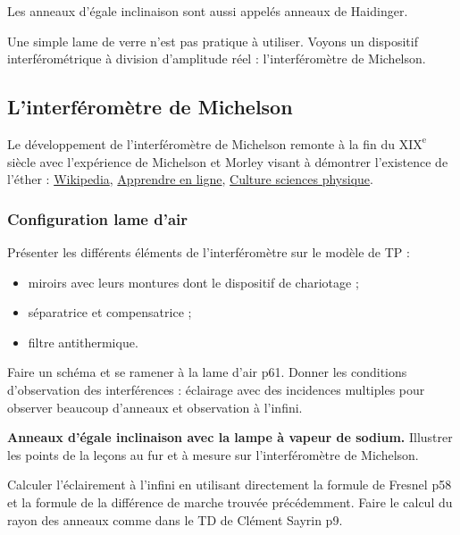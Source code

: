 \begin{remarque}
Les anneaux d'égale inclinaison sont aussi appelés anneaux de Haidinger.
\end{remarque}

\begin{transition}
Une simple lame de verre n'est pas pratique à utiliser.
Voyons un dispositif interférométrique à division d'amplitude réel : l'interféromètre de Michelson.
\end{transition}

\subsection{L'interféromètre de Michelson}

\begin{remarque}
Le développement de l'interféromètre de Michelson remonte à la fin du $\mathrm{XIX^e}$ siècle avec l'expérience de Michelson et Morley visant à démontrer l'existence de l'éther : \href{https://fr.wikipedia.org/wiki/Exp\%C3\%A9rience_de_Michelson_et_Morley}{Wikipedia}, \href{https://owl-ge.ch/travaux-d-eleves/2007-2008/article/l-experience-de-michelson-morley}{Apprendre en ligne}, \href{http://culturesciencesphysique.ens-lyon.fr/ressource/physique-animee-Michelson-Morley.xml}{Culture sciences physique}.
\end{remarque}

\subsubsection{Configuration lame d'air}

Présenter les différents éléments de l'interféromètre sur le modèle de TP :
\begin{itemize}
\item miroirs avec leurs montures dont le dispositif de chariotage ;
\item séparatrice et compensatrice ;
\item filtre antithermique.
\end{itemize}

Faire un schéma et se ramener à la lame d'air \cite{Olivier2000} p61.
Donner les conditions d'observation des interférences : éclairage avec des incidences multiples pour observer beaucoup d'anneaux et observation à l'infini. 

\begin{experience}
\textbf{Anneaux d'égale inclinaison avec la lampe à vapeur de sodium.}
Illustrer les points de la leçons au fur et à mesure sur l'interféromètre de Michelson.
\end{experience}
Calculer l'éclairement à l'infini en utilisant directement la formule de Fresnel \cite{Olivier2000} p58 et la formule de la différence de marche trouvée précédemment.
Faire le calcul du rayon des anneaux comme dans le TD de Clément Sayrin p9.

